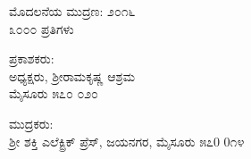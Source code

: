 \thispagestyle{empty}

\begin{center}
ಮೊದಲನೆಯ ಮುದ್ರಣ: ೨೦೧೬\\೩೦೦೦ ಪ್ರತಿಗಳು
\end{center}

\begin{center}
ಪ್ರಕಾಶಕರು: \\ಅಧ್ಯಕ್ಷರು, ಶ್ರೀರಾಮಕೃಷ್ಣ ಆಶ್ರಮ\\ಮೈಸೂರು ೫೭೦ ೦೨೦
\end{center}

\begin{center}
ಮುದ್ರಕರು: \\ಶ್ರೀ ಶಕ್ತಿ ಎಲೆಕ್ಟ್ರಿಕ್ ಪ್ರೆಸ್, ಜಯನಗರ, ಮೈಸೂರು ೫೭0 0೧೪
\end{center}


